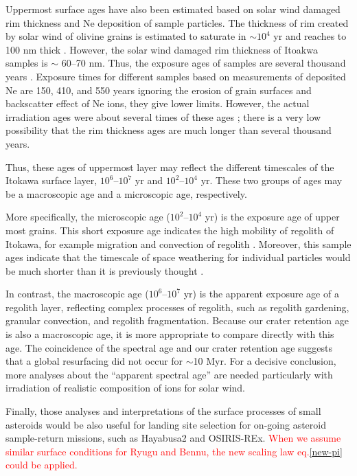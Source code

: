 \documentclass[3p,authoryear]{elsarticle}
\newcommand{\red}[1]{\textcolor{red}{#1}}
\begin{document}
Uppermost surface ages have also been estimated based on solar wind damaged rim thickness and Ne deposition of sample particles. The thickness of rim created by solar wind of olivine grains is estimated to saturate in $\sim 10^4$ yr and reaches to 100 nm thick \citep{keller2016}. However, the solar wind damaged rim thickness of Itoakwa samples is $\sim$ 60--70 nm. Thus, the exposure ages of samples are several thousand years \citep{berger2015}. Exposure times for different samples based on measurements of deposited Ne are 150, 410, and 550 years ignoring the erosion of grain surfaces and backscatter effect of Ne ions, they give lower limits. However, the actual irradiation ages were about several times of these ages \citep{nagao2011}; there is a very low possibility that the rim thickness ages are much longer than several thousand years.

Thus, these ages of uppermost layer may reflect the different timescales of the Itokawa surface layer, $10^6$--$10^7$ yr and $10^2$--$10^4$ yr. These two groups of ages may be a macroscopic age and a microscopic age, respectively.

More specifically, the microscopic age ($10^2$--$10^4$ yr) is the exposure age of upper most grains. This short exposure age indicates the high mobility of regolith of Itokawa, for example migration and convection of regolith \citep{miyamoto2007}. Moreover, this sample ages indicate that the timescale of space weathering for individual particles would be much shorter than it is previously thought \citep{strazzulla2005}.

In contrast, the macroscopic age ($10^6$--$10^7$ yr) is the apparent exposure age of a regolith layer, reflecting complex processes of regolith, such as regolith gardening, granular convection, and regolith fragmentation. Because our crater retention age is also a macroscopic age, it is more appropriate to compare directly with this age. The coincidence of the spectral age and our crater retention age suggests that a global resurfacing did not occur for $\sim$10 Myr. For a decisive conclusion, more analyses about the ``apparent spectral age'' are needed particularly with irradiation of realistic composition of ions for solar wind. 

Finally, those analyses and interpretations of the surface processes of small asteroids would be also useful for landing site selection for on-going asteroid sample-return missions, such as Hayabusa2 and OSIRIS-REx.
\red{When we assume similar surface conditions for Ryugu and Bennu, the new scaling law eq.\eqref{new-pi} could be applied.} 
\end{document}
